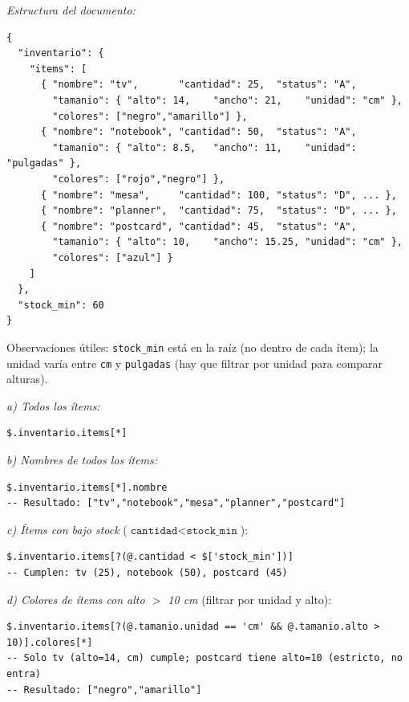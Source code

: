 \documentclass[11pt,a4paper]{article}
\begin{document}
\textit{Estructura del documento:}

\begin{lstlisting}[style=plain]
{
  "inventario": {
    "items": [
      { "nombre": "tv",       "cantidad": 25,  "status": "A",
        "tamanio": { "alto": 14,    "ancho": 21,    "unidad": "cm" },
        "colores": ["negro","amarillo"] },
      { "nombre": "notebook", "cantidad": 50,  "status": "A",
        "tamanio": { "alto": 8.5,   "ancho": 11,    "unidad": "pulgadas" },
        "colores": ["rojo","negro"] },
      { "nombre": "mesa",     "cantidad": 100, "status": "D", ... },
      { "nombre": "planner",  "cantidad": 75,  "status": "D", ... },
      { "nombre": "postcard", "cantidad": 45,  "status": "A",
        "tamanio": { "alto": 10,    "ancho": 15.25, "unidad": "cm" },
        "colores": ["azul"] }
    ]
  },
  "stock_min": 60
}
\end{lstlisting}

Observaciones útiles: \texttt{stock\_min} está en la raíz (no dentro de cada ítem); la unidad varía entre \texttt{cm} y \texttt{pulgadas} (hay que filtrar por unidad para comparar alturas).

\textit{a) Todos los ítems:}

\begin{lstlisting}[style=plain]
$.inventario.items[*]
\end{lstlisting}

\textit{b) Nombres de todos los ítems:}

\begin{lstlisting}[style=plain]
$.inventario.items[*].nombre
-- Resultado: ["tv","notebook","mesa","planner","postcard"]
\end{lstlisting}

\textit{c) Ítems con bajo stock} ($\texttt{cantidad} < \texttt{stock\_min}$):

\begin{lstlisting}[style=plain]
$.inventario.items[?(@.cantidad < $['stock_min'])]
-- Cumplen: tv (25), notebook (50), postcard (45)
\end{lstlisting}

\textit{d) Colores de ítems con alto $>$ 10 cm} (filtrar por unidad y alto):

\begin{lstlisting}[style=plain]
$.inventario.items[?(@.tamanio.unidad == 'cm' && @.tamanio.alto > 10)].colores[*]
-- Solo tv (alto=14, cm) cumple; postcard tiene alto=10 (estricto, no entra)
-- Resultado: ["negro","amarillo"]
\end{lstlisting}
\end{document}
